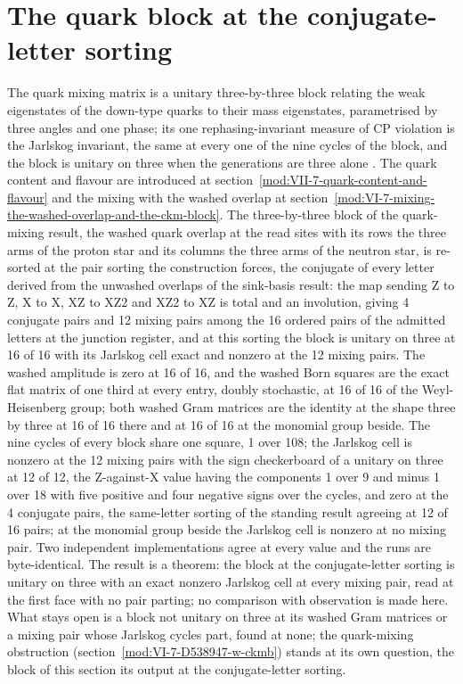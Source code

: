 \section{The quark block at the conjugate-letter sorting}\label{mod:VII-7-D539621-kcsc-t1}
The quark mixing matrix is a unitary three-by-three block relating the weak eigenstates of the down-type quarks to their mass eigenstates, parametrised by three angles and one phase; its one rephasing-invariant measure of CP violation is the Jarlskog invariant, the same at every one of the nine cycles of the block, and the block is unitary on three when the generations are three alone \cite{Cabibbo1963,Kobayashi1973,Jarlskog1985}. The quark content and flavour are introduced at section~\ref{mod:VII-7-quark-content-and-flavour} and the mixing with the washed overlap at section~\ref{mod:VI-7-mixing-the-washed-overlap-and-the-ckm-block}.
The three-by-three block of the quark-mixing result, the washed quark overlap at the read sites with its rows the three arms of the proton star and its columns the three arms of the neutron star, is re-sorted at the pair sorting the construction forces, the conjugate of every letter derived from the unwashed overlaps of the sink-basis result: the map sending Z to Z, X to X, XZ to XZ2 and XZ2 to XZ is total and an involution, giving 4 conjugate pairs and 12 mixing pairs among the 16 ordered pairs of the admitted letters at the junction register, and at this sorting the block is unitary on three at 16 of 16 with its Jarlskog cell exact and nonzero at the 12 mixing pairs.
The washed amplitude is zero at 16 of 16, and the washed Born squares are the exact flat matrix of one third at every entry, doubly stochastic, at 16 of 16 of the Weyl-Heisenberg group; both washed Gram matrices are the identity at the shape three by three at 16 of 16 there and at 16 of 16 at the monomial group beside. The nine cycles of every block share one square, 1 over 108; the Jarlskog cell is nonzero at the 12 mixing pairs with the sign checkerboard of a unitary on three at 12 of 12, the Z-against-X value having the components 1 over 9 and minus 1 over 18 with five positive and four negative signs over the cycles, and zero at the 4 conjugate pairs, the same-letter sorting of the standing result agreeing at 12 of 16 pairs; at the monomial group beside the Jarlskog cell is nonzero at no mixing pair. Two independent implementations agree at every value and the runs are byte-identical.
The result is a theorem: the block at the conjugate-letter sorting is unitary on three with an exact nonzero Jarlskog cell at every mixing pair, read at the first face with no pair parting; no comparison with observation is made here.
What stays open is a block not unitary on three at its washed Gram matrices or a mixing pair whose Jarlskog cycles part, found at none; the quark-mixing obstruction (section~\ref{mod:VI-7-D538947-w-ckmb}) stands at its own question, the block of this section its output at the conjugate-letter sorting.
